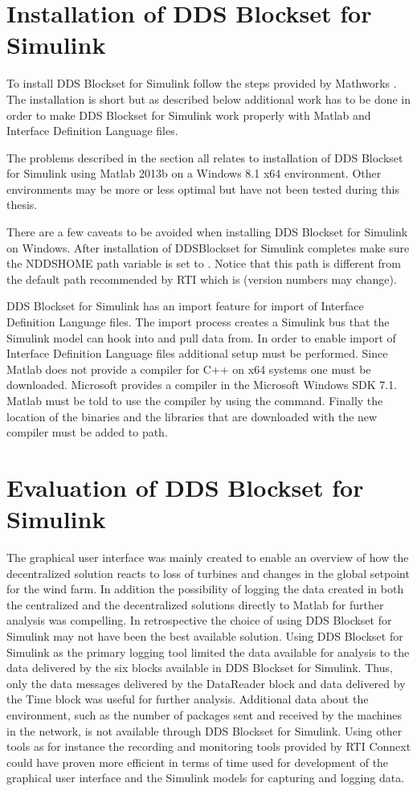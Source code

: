 \section{Installation of DDS Blockset for Simulink}
To install DDS Blockset for Simulink follow the steps provided by Mathworks \cite{DDSBlocksetPilotSupportPackageUserGuide}. The installation is short but as described below additional work has to be done in order to make DDS Blockset for Simulink work properly with Matlab and Interface Definition Language files.

The problems described in the section all relates to installation of DDS Blockset for Simulink using Matlab 2013b on a Windows 8.1 x64 environment.
Other environments may be more or less optimal but have not been tested during this thesis.

There are a few caveats to be avoided when installing DDS Blockset for Simulink on Windows.
After installation of DDSBlockset for Simulink completes make sure the NDDSHOME path variable is set to .
Notice that this path is different from the default path recommended by RTI which is  (version numbers may change).

DDS Blockset for Simulink has an import feature for import of Interface Definition Language files. The import process creates a Simulink bus that the Simulink model can hook into and pull data from. In order to enable import of Interface Definition Language files additional setup must be performed.
Since Matlab does not provide a compiler for C++ on x64 systems one must be downloaded. Microsoft provides a compiler in the Microsoft Windows SDK 7.1. Matlab must be told to use the compiler by using the  command. Finally the location of the binaries and the libraries that are downloaded with the new compiler must be added to path.

\section{Evaluation of DDS Blockset for Simulink}
The graphical user interface was mainly created to enable an overview of how the decentralized solution reacts to loss of turbines and changes in the global setpoint for the wind farm. In addition the possibility of logging the data created in both the centralized and the decentralized solutions directly to Matlab for further analysis was compelling.
In retrospective the choice of using DDS Blockset for Simulink may not have been the best available solution. Using DDS Blockset for Simulink as the primary logging tool limited the data available for analysis to the data delivered by the six blocks available in DDS Blockset for Simulink.
Thus, only the data messages delivered by the DataReader block and data delivered by the Time block was useful for further analysis. Additional data about the environment, such as the number of packages sent and received by the machines in the network, is not available through DDS Blockset for Simulink.
Using other tools as for instance the recording and monitoring tools provided by RTI Connext could have proven more efficient in terms of time used for development of the graphical user interface and the Simulink models for capturing and logging data.